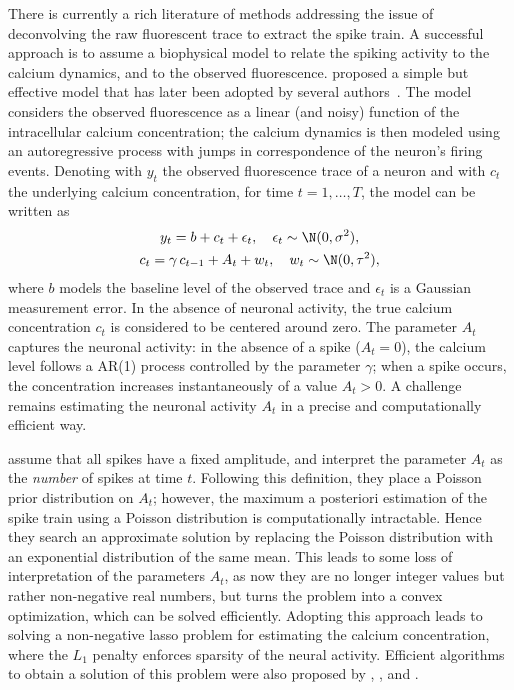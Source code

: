 There is currently a rich literature of methods addressing the issue of deconvolving the raw fluorescent trace to extract the spike train. A successful approach is to assume a biophysical model to relate the spiking activity to the calcium dynamics, and to the observed fluorescence. \citet{vogelstein2010} proposed a simple but effective model that has later been adopted by several authors~\citep{pnevmatikakis2016, friedrich2016, friedrich2017, jewell2018, jewell2019}. The model considers the observed fluorescence as a linear (and noisy) function of the intracellular calcium concentration; the calcium dynamics is then modeled using an autoregressive process with jumps in correspondence of the neuron's firing events.
Denoting with $y_t$ the observed fluorescence trace of a neuron and with $c_t$ the underlying calcium concentration, for time $t=1,\dots,T$, the model can be written as
\begin{equation}
\begin{gathered}
y_t = b + c_t + \epsilon_t,\quad \epsilon_t \sim \N(0,\sigma^2),  \\
c_t = \gamma\, c_{t-1} + A_t + w_t, \quad w_t \sim \N(0, \tau^2),
\end{gathered}
\label{eq:ch1_armodel}
\end{equation}
where $b$ models the baseline level of the observed trace and $\epsilon_t$ is a Gaussian measurement error. In the absence of neuronal activity, the true calcium concentration $c_t$ is considered to be centered around zero. The parameter $A_t$ captures the neuronal activity: in the absence of a spike ($A_t = 0$), the calcium level follows a AR(1) process controlled by the parameter $\gamma$; when a spike occurs, the concentration increases instantaneously of a value $A_t > 0$.
A challenge remains estimating the neuronal activity $A_t$ in a precise and computationally efficient way.

\citet{vogelstein2010} assume that all spikes have a fixed amplitude, and interpret the parameter $A_t$ as the \textit{number} of spikes at time $t$. Following this definition, they place a Poisson prior distribution on $A_t$; however, the maximum a posteriori estimation of the spike train using a Poisson distribution is computationally intractable. Hence they search an approximate solution by replacing the Poisson distribution with an exponential distribution of the same mean. This leads to some loss of interpretation of the parameters $A_t$, as now they are no longer integer values but rather non-negative real numbers, but turns the problem into a convex optimization, which can be solved efficiently.
Adopting this approach leads to solving a non-negative lasso problem for estimating the calcium concentration, where the $L_1$ penalty enforces sparsity of the neural activity.
Efficient algorithms to obtain a solution of this problem were also proposed by \citet{pnevmatikakis2016}, \citet{friedrich2016}, and \citet{friedrich2017}.

